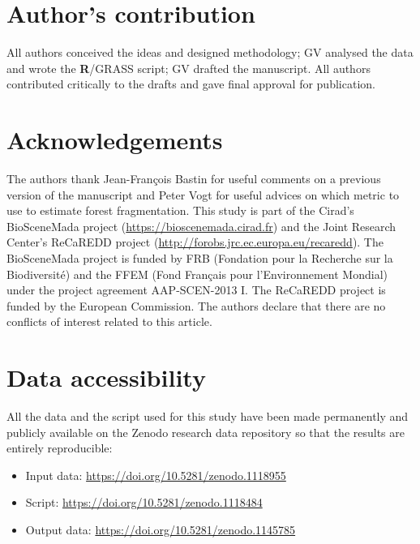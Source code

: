 \documentclass[a4paper, 12pt, leqno]{article}\usepackage[]{graphicx}\usepackage[]{color}
\newcommand{\R}{\textnormal{\sffamily\bfseries R}}
\begin{document}
\newpage

\section{Author's contribution}
\label{authors-contribution}

All authors conceived the ideas and designed methodology; GV analysed
the data and wrote the {\R}/GRASS script; GV drafted the manuscript. All
authors contributed critically to the drafts and gave final approval for
publication.

\section{Acknowledgements}
\label{acknowledgements}

The authors thank Jean-François Bastin for useful comments on a previous
version of the manuscript and Peter Vogt for useful advices on which
metric to use to estimate forest fragmentation. This study is part of
the Cirad's BioSceneMada project (\url{https://bioscenemada.cirad.fr})
and the Joint Research Center's ReCaREDD project
(\url{http://forobs.jrc.ec.europa.eu/recaredd}). The BioSceneMada
project is funded by FRB (Fondation pour la Recherche sur la
Biodiversité) and the FFEM (Fond Français pour l'Environnement
Mondial) under the project agreement AAP-SCEN-2013 I. The ReCaREDD
project is funded by the European Commission. The authors declare that there are no conflicts of interest related to this article.

\section{Data accessibility}
\label{data-accessibility}

All the data and the script used for this study have been made permanently and publicly available
on the Zenodo research data repository so that the results are entirely reproducible:
\begin{itemize}
\item Input data: \url{https://doi.org/10.5281/zenodo.1118955}
\item Script: \url{https://doi.org/10.5281/zenodo.1118484}
\item Output data: \url{https://doi.org/10.5281/zenodo.1145785}
\end{itemize}

\newpage
\singlespacing

\end{document}
